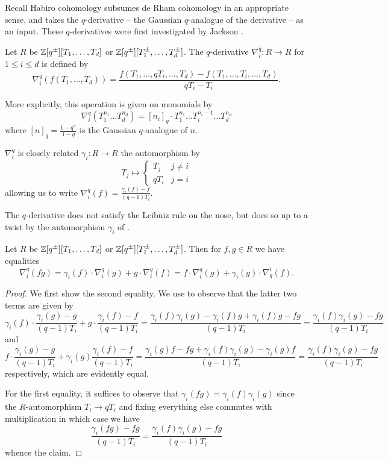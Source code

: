 Recall Habiro cohomology subsumes de Rham cohomology in an appropriate sense, and takes the $q$-derivative -- the Gaussian $q$-analogue of the derivative -- as an input. These $q$-derivatives were first investigated by Jackson \cite{Jackson}.
\begin{definition}[$q$-Derivative]\label{def: q-derivative}
    Let $R$ be $\mathbb{Z}[q^{\pm}][T_{1},\dots,T_{d}]$ or $\mathbb{Z}[q^{\pm}][T_{1}^{\pm},\dots,T_{d}^{\pm}]$. The $q$-derivative $\nabla_{i}^{q}:R\to R$ for $1\leq i\leq d$ is defined by 
    $$\nabla_{i}^{q}(f(T_{1},\dots,T_{d}))=\frac{f(T_{1},\dots,qT_{i},\dots,T_{d})-f(T_{1},\dots,T_{i},\dots,T_{d})}{qT_{i}-T_{i}}.$$
\end{definition}
\begin{remark}
    More explicitly, this operation is given on monomials by 
    $$\nabla_{i}^{q}(T_{1}^{n_{1}}\dots T_{d}^{n_{d}})=[n_{i}]_{q}\cdot T_{1}^{n_{1}}\dots T_{i}^{n_{i}-1}\dots T_{d}^{n_{d}}$$
    where $[n]_{q}=\frac{1-q^{n}}{1-q}$ is the Gaussian $q$-analogue of $n$. 
\end{remark}
\begin{remark}\label{rmk: gamma i maps}
    $\nabla_{i}^{q}$ is closely related $\gamma_{i}:R\to R$ the automorphism by 
    $$T_{j}\mapsto\begin{cases}
        T_{j} & j\neq i \\
        qT_{i} & j=i
    \end{cases}$$
    allowing us to write $\nabla_{i}^{q}(f)=\frac{\gamma_{i}(f)-f}{(q-1)T_{i}}$. 
\end{remark}
The $q$-derivative does not satisfy the Leibniz rule on the nose, but does so up to a twist by the automorphism $\gamma_{i}$ of . 
\begin{lemma}\label{lem: twisted q-leibniz}
    Let $R$ be $\mathbb{Z}[q^{\pm}][T_{1},\dots,T_{d}]$ or $\mathbb{Z}[q^{\pm}][T_{1}^{\pm},\dots,T_{d}^{\pm}]$. Then for $f,g\in R$ we have equalities 
    $$\nabla_{i}^{q}(fg)=\gamma_{i}(f)\cdot\nabla_{i}^{q}(g)+g\cdot\nabla_{i}^{q}(f)=f\cdot\nabla_{i}^{q}(g)+\gamma_{i}(g)\cdot\nabla^{i}_{q}(f).$$
\end{lemma}
\begin{proof}
    We first show the second equality. We use  to observe that the latter two terms are given by 
    $$\gamma_{i}(f)\cdot\frac{\gamma_{i}(g)-g}{(q-1)T_{i}}+g\cdot\frac{\gamma_{i}(f)-f}{(q-1)T_{i}}=\frac{\gamma_{i}(f)\gamma_{i}(g)-\gamma_{i}(f)g+\gamma_{i}(f)g-fg}{(q-1)T_{i}}=\frac{\gamma_{i}(f)\gamma_{i}(g)-fg}{(q-1)T_{i}}$$
    and 
    $$f\cdot\frac{\gamma_{i}(g)-g}{(q-1)T_{i}}+\gamma_{i}(g)\frac{\gamma_{i}(f)-f}{(q-1)T_{i}}=\frac{\gamma_{i}(g)f-fg+\gamma_{i}(f)\gamma_{i}(g)-\gamma_{i}(g)f}{(q-1)T_{i}}=\frac{\gamma_{i}(f)\gamma_{i}(g)-fg}{(q-1)T_{i}}$$
    respectively, which are evidently equal. 

    For the first equality, it suffices to observe that $\gamma_{i}(fg)=\gamma_{i}(f)\gamma_{i}(g)$ since the $R$-automorphism $T_{i}\to qT_{i}$ and fixing everything else commutes with multiplication in which case we have 
    $$\frac{\gamma_{i}(fg)-fg}{(q-1)T_{i}}=\frac{\gamma_{i}(f)\gamma_{i}(g)-fg}{(q-1)T_{i}}$$
    whence the claim. 
\end{proof}
